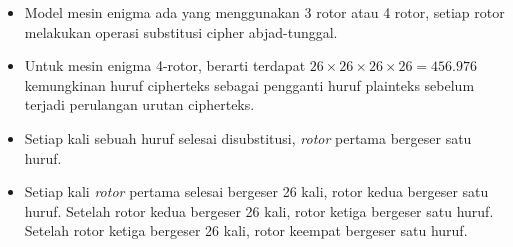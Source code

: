 \documentclass{article}
\begin{document}

\begin{itemize}
  \item Model mesin enigma ada yang menggunakan 3 rotor atau 4 rotor, setiap rotor melakukan operasi substitusi cipher abjad-tunggal.
  \item Untuk mesin enigma 4-rotor, berarti terdapat $26 \times 26 \times 26 \times 26 = 456.976$ kemungkinan huruf cipherteks sebagai pengganti huruf plainteks sebelum terjadi perulangan urutan cipherteks.
  \item Setiap kali sebuah huruf selesai disubstitusi, \textit{rotor} pertama bergeser satu huruf.
  \item Setiap kali \textit{rotor} pertama selesai bergeser 26 kali, rotor kedua bergeser satu huruf. Setelah rotor kedua bergeser 26 kali, rotor ketiga bergeser satu huruf. Setelah rotor ketiga bergeser 26 kali, rotor keempat bergeser satu huruf.
\end{itemize}
\end{document}
